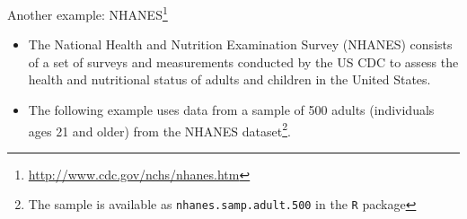 \documentclass[10pt,handout]{beamer}\usepackage[]{graphicx}\usepackage[]{color}
\begin{document}
\begin{frame}{Another example: NHANES\footnote{\tiny{\url{http://www.cdc.gov/nchs/nhanes.htm}}}}
	\begin{itemize}
		\item The National Health and Nutrition Examination Survey (NHANES) consists of a set of surveys and measurements conducted by the US CDC to assess the health and nutritional status of adults	and children in the United States. 
		\item The following example uses data from a sample of 500 adults (individuals ages 21 and older) from the NHANES dataset\footnote{\tiny{The sample is available as \texttt{nhanes.samp.adult.500} in the \texttt{R}  package}}.
	\end{itemize}
\end{frame}
\end{document}
